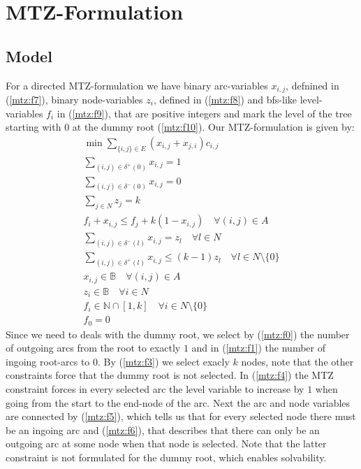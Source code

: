 \documentclass[11pt]{article}
\begin{document}
\section{MTZ-Formulation}
\subsection{Model}
For a directed MTZ-formulation we have binary arc-variables $x_{i,j}$, defnined in (\ref{mtz:f7}), binary node-variables $z_{i}$, defined in (\ref{mtz:f8}) and bfs-like level-variables $f_i$ in (\ref{mtz:f9}), that are positive integers and mark the level of the tree starting with $0$ at the dummy root (\ref{mtz:f10}). Our MTZ-formulation is given by: 
\begin{gather}
  \min\sum\limits_{\{i,j\}\in E}(x_{i,j}+ x_{j,i})c_{i,j} \label{mtz:f0}\\
  \sum\limits_{(i,j)\in \delta^+(0) } x_{i,j} =1 \label{mtz:f1}\\
  \sum\limits_{(i,j)\in \delta^-(0) } x_{i,j} =0 \label{mtz:f2}\\
  \sum\limits_{j\in N} z_j = k\label{mtz:f3}\\
  f_i + x_{i,j} \leq f_j + k(1-x_{i,j}) \quad \forall (i,j)\in A \label{mtz:f4} \\
  \sum\limits_{(i,j)\in \delta^-(l)} x_{i,j} = z_l \quad \forall l\in N\label{mtz:f5}\\
  \sum\limits_{(i,j)\in \delta^+(l)} x_{i,j} \leq (k-1)z_l \quad \forall l\in N\setminus \{0\}\label{mtz:f6}\\
  x_{i,j} \in \mathbb{B} \quad \forall (i,j)\in A\label{mtz:f7}\\
  z_{i} \in \mathbb{B} \quad \forall i \in N\label{mtz:f8}\\
  f_{i} \in \mathbb{N}\cap[1,k] \quad \forall i \in N \setminus \{0\}\label{mtz:f9}\\
  f_{0} = 0 \label{mtz:f10}
\end{gather}
Since we need to deals with the dummy root, we select by (\ref{mtz:f0}) the number of outgoing arcs from the root to exactly $1$ and in (\ref{mtz:f1}) the number of ingoing root-arcs to $0$.
By (\ref{mtz:f3}) we select exacly $k$ nodes, note that the other constraints force that the dummy root is not selected.
In (\ref{mtz:f4}) the MTZ constraint forces in every selected arc the level variable to increase by $1$ when going from the start to the end-node of the arc. Next the arc and node variables are connected by (\ref{mtz:f5}), which tells us that for every selected node there must be an ingoing arc and (\ref{mtz:f6}), that describes that there can only be an outgoing arc at some node when that node is selected. Note that the latter constraint is not formulated for the dummy root, which enables solvability.
\end{document}
